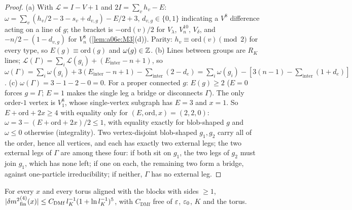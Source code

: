 \begin{proof}
(a) With $\mathcal L=I-V+1$ and $2I=\sum_vh_v-E$: $\omega=\sum_v(h_v/2-3-s_v+d_{v,g})-E/2+3$, $d_{v,g}\in\{0,1\}$ indicating a $V^8$ difference acting on a line of $g$; the bracket is $-\mathrm{ord}(v)/2$ for $V_\lambda$, $V^{10}_n$, $V_\delta$, and $-n/2-(1-d_{v,g})$ for $V^8_n$ (\cref{lem:a06e:M3}(d)). Parity: $h_v\equiv\mathrm{ord}(v)\pmod2$ for every type, so $E(g)\equiv\mathrm{ord}(g)$ and $\omega(g)\in\mathbb Z$. (b) Lines between groups are $R_K$ lines; $\mathcal L(\Gamma)=\sum_i\mathcal L(g_i)+(E_{\mathrm{inter}}-n+1)$, so $\omega(\Gamma)=\sum_i\omega(g_i)+3(E_{\mathrm{inter}}-n+1)-\sum_{\mathrm{inter}}(2-d_e)=\sum_i\omega(g_i)-[3(n-1)-\sum_{\mathrm{inter}}(1+d_e)]$. (c) $\omega(\Gamma)=3-1-2-0=0$. For a proper connected $g$: $E(g)\ge2$ ($E=0$ forces $g=\Gamma$; $E=1$ makes the single leg a bridge or disconnects $\Gamma$). The only order-$1$ vertex is $V^8_1$, whose single-vertex subgraph has $E=3$ and $x=1$. So $E+\mathrm{ord}+2x\ge4$ with equality only for $(E,\mathrm{ord},x)=(2,2,0)$: $\omega=3-(E+\mathrm{ord}+2x)/2\le1$, with equality exactly for blob-shaped $g$ and $\omega\le0$ otherwise (integrality). Two vertex-disjoint blob-shaped $g_1,g_2$ carry all of the order, hence all vertices, and each has exactly two external legs; the two external legs of $\Gamma$ are among these four: if both sit on $g_1$, the two legs of $g_2$ must join $g_1$, which has none left; if one on each, the remaining two form a bridge, against one-particle irreducibility; if neither, $\Gamma$ has no external leg.
\end{proof}

\begin{theorem}\label{thm:a06e:DMf}
For every $x$ and every torus aligned with the blocks with sides $\ge1$, $|{\delta m^2}^{(4)}_{\mathrm{fin}}(x)|\le C_{\mathrm{DMf}}\,l_K^{-1}(1+\ln l_K^{-1})^5$, with $C_{\mathrm{DMf}}$ free of $\varepsilon$, $\varepsilon_0$, $K$ and the torus.
\end{theorem}

